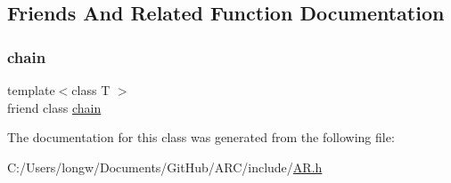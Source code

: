 \subsection{Friends And Related Function Documentation}
\hypertarget{classARC_1_1chainslowdown_a498fbb4337b9878a5f0044996e4a2489}{}\label{classARC_1_1chainslowdown_a498fbb4337b9878a5f0044996e4a2489} 
\subsubsection{\texorpdfstring{chain}{chain}}
{\footnotesize\ttfamily template$<$class T $>$ \\
friend class \hyperlink{classARC_1_1chain}{chain}\hspace{0.3cm}{\ttfamily [friend]}}



The documentation for this class was generated from the following file\+:\begin{DoxyCompactItemize}
\item 
C\+:/\+Users/longw/\+Documents/\+Git\+Hub/\+A\+R\+C/include/\hyperlink{AR_8h}{A\+R.\+h}\end{DoxyCompactItemize}
